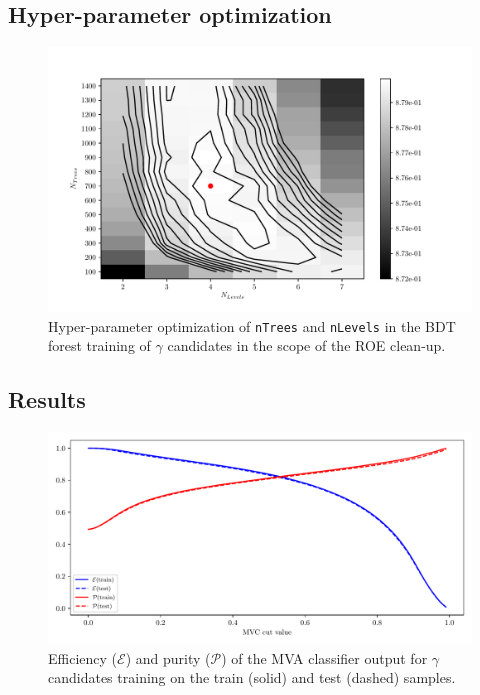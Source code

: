 \documentclass[headings=standardclasses,headings=big,oneside,a4paper,openany,12pt]{scrbook}
\begin{document}
\subsection*{Hyper-parameter optimization}

\begin{figure}[H]
\centering
\captionsetup{width=0.8\linewidth}
\includegraphics[width=\linewidth]{fig/addendums/gamma_hpo}
\caption{Hyper-parameter optimization of \texttt{nTrees} and \texttt{nLevels} in the BDT forest training of $\gamma$ candidates in the scope of the ROE clean-up.}
\end{figure}

\subsection*{Results}

\begin{figure}[H]
\centering
\captionsetup{width=0.8\linewidth}
\includegraphics[width=\linewidth]{fig/addendums/gamma_effpur}
\caption{Efficiency ($\mathcal{E}$) and purity ($\mathcal{P}$) of the MVA classifier output for $\gamma$ candidates training on the train (solid) and test (dashed) samples.}
\end{figure}
\end{document}

